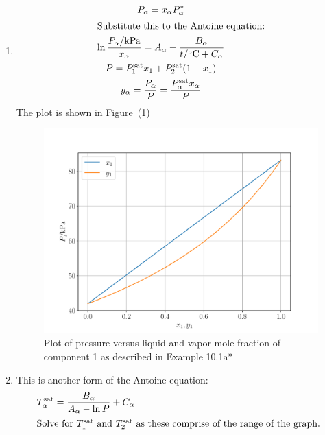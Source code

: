 \documentclass[../main.tex]{subfiles}
\begin{document}
\begin{solution}%
  \begin{enumerate}[label=(\alph*)]
    \item
      \begin{gather*}%
        P_{\alpha} = x_{\alpha}P_{\alpha}^{*}\\
        \intertext{Substitute this to the Antoine equation:}
        \ln{\frac{P_{\alpha}/\unit{\kilo\pascal}}{x_{\alpha}}} = A_{\alpha} -
        \frac{B_{\alpha}}{t/\unit{\degreeCelsius}+C_{\alpha}}\\
        P = P_{1}^{\text{sat}}x_{1} + P_{2}^{\text{sat}}(1-x_{1})\\
        y_{\alpha} = \frac{P_{\alpha}}{P} =
        \frac{P_{\alpha}^{\text{sat}}x_{\alpha}}{P}
      \end{gather*}
      The plot is shown in Figure~(\ref{fig:e10-1a})
      \begin{figure}[h!]
        \centering
        \includegraphics[scale=0.5]{../img/e10-1.pdf}%
        \caption{Plot of pressure versus liquid and vapor mole fraction
        of component 1 as described in Example 10.1a*}
        \label{fig:e10-1a}
      \end{figure}
    \item
      This is another form of the Antoine equation:
      \begin{gather*}%
        T_{\alpha}^{\text{sat}} = \frac{B_{\alpha}}{A_{\alpha} - \ln
        P} + C_{\alpha}\\
        \intertext{Solve for $T_{1}^{\text{sat}}$ and
          $T_{2}^{\text{sat}}$ as these comprise of the range of the graph. %
}
\end{gather*}
\end{enumerate}
\end{solution}
\end{document}
